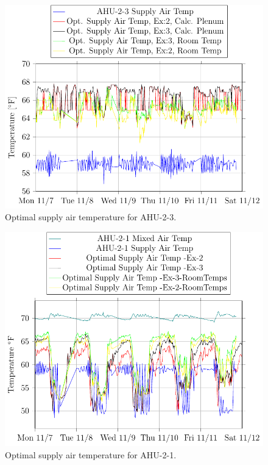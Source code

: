 \begin{figure}
\centering
\includegraphics[]{Plots/2016-11-16-1354-AHU23SupplyAirTemp-TikzData.pdf}
\caption{Optimal supply air temperature for AHU-2-3.}
\label{fig:2016-11-16-1354-AHU23SupplyAirTemp-TikzData}
\end{figure}

\begin{figure}
\centering
\includegraphics[]{Plots/2016-11-16-1618-AHU21MixedAirTemp-TikzData.pdf}
\caption{Optimal supply air temperature for AHU-2-1.}
\label{fig:2016-11-16-1618-AHU21MixedAirTemp-TikzData}
\end{figure}

